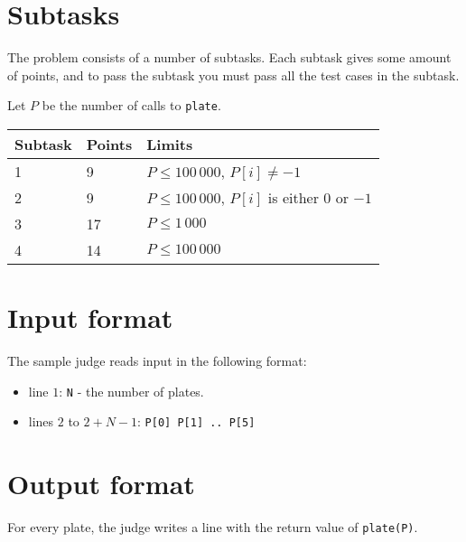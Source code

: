 \section*{Subtasks}
The problem consists of a number of subtasks. Each subtask gives some amount of points, and to pass
the subtask you must pass all the test cases in the subtask.

Let $P$ be the number of calls to \texttt{plate}.

\begin{tabular}{|l|l|l|}
  \hline
  \textbf{Subtask} & \textbf{Points} & \textbf{Limits} \\ \hline
  1 & 9 & $P \le 100\,000$, $P[i] \not= -1$ \\ \hline
  2 & 9 & $P \le 100\,000$, $P[i]$ is either $0$ or $-1$ \\ \hline
  3 & 17 & $P \le 1\,000$ \\ \hline
  4 & 14 & $P \le 100\,000$ \\ \hline
\end{tabular}

\section*{Input format}
The sample judge reads input in the following format:

\begin{itemize}
  \item line $1$: \texttt{N} - the number of plates.
  \item lines $2$ to $2 + N - 1$: \texttt{P[0] P[1] .. P[5]}
\end{itemize}

\section*{Output format}
For every plate, the judge writes a line with the return value of \texttt{plate(P)}.
